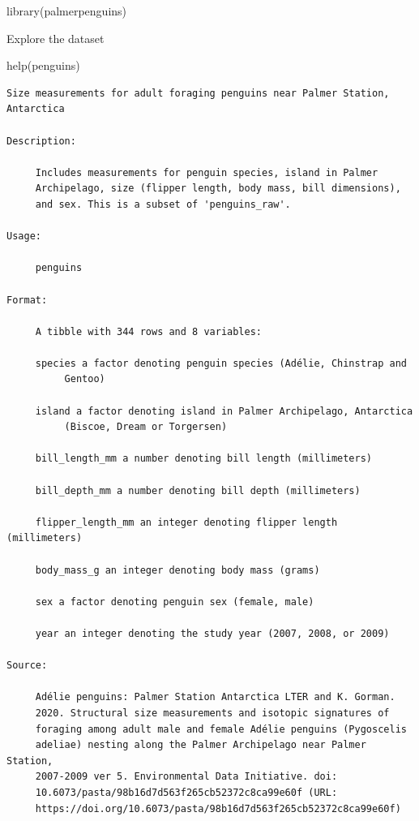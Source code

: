 \documentclass[
  letterpaper,
  DIV=11,
  numbers=noendperiod]{scrreprt}
\newenvironment{Shaded}{\begin{snugshade}}{\end{snugshade}}
\newcommand{\FunctionTok}[1]{\textcolor[rgb]{0.28,0.35,0.67}{#1}}
\newcommand{\NormalTok}[1]{\textcolor[rgb]{0.00,0.23,0.31}{#1}}
\begin{document}
\begin{Shaded}
\begin{Highlighting}[]
\FunctionTok{library}\NormalTok{(palmerpenguins)}
\end{Highlighting}
\end{Shaded}

Explore the dataset

\begin{Shaded}
\begin{Highlighting}[]
\FunctionTok{help}\NormalTok{(penguins)}
\end{Highlighting}
\end{Shaded}

\begin{verbatim}
Size measurements for adult foraging penguins near Palmer Station,
Antarctica

Description:

     Includes measurements for penguin species, island in Palmer
     Archipelago, size (flipper length, body mass, bill dimensions),
     and sex. This is a subset of 'penguins_raw'.

Usage:

     penguins
     
Format:

     A tibble with 344 rows and 8 variables:

     species a factor denoting penguin species (Adélie, Chinstrap and
          Gentoo)

     island a factor denoting island in Palmer Archipelago, Antarctica
          (Biscoe, Dream or Torgersen)

     bill_length_mm a number denoting bill length (millimeters)

     bill_depth_mm a number denoting bill depth (millimeters)

     flipper_length_mm an integer denoting flipper length (millimeters)

     body_mass_g an integer denoting body mass (grams)

     sex a factor denoting penguin sex (female, male)

     year an integer denoting the study year (2007, 2008, or 2009)

Source:

     Adélie penguins: Palmer Station Antarctica LTER and K. Gorman.
     2020. Structural size measurements and isotopic signatures of
     foraging among adult male and female Adélie penguins (Pygoscelis
     adeliae) nesting along the Palmer Archipelago near Palmer Station,
     2007-2009 ver 5. Environmental Data Initiative. doi:
     10.6073/pasta/98b16d7d563f265cb52372c8ca99e60f (URL:
     https://doi.org/10.6073/pasta/98b16d7d563f265cb52372c8ca99e60f)


\end{verbatim}
\end{document}
